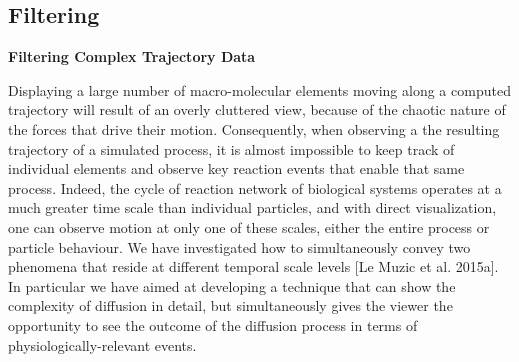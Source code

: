 \subsection{Filtering}

\textbf{Filtering Complex Trajectory Data}

Displaying a large number of macro-molecular elements moving along a computed trajectory will result of an overly cluttered view, because of the chaotic nature of the forces that drive their motion.
Consequently, when observing a the resulting trajectory of a simulated process, it is almost impossible to keep track of individual elements and observe key reaction events that enable that same process. 
Indeed, the cycle of reaction network of biological systems operates at a much greater time scale than individual particles, and with direct visualization, one can observe motion at only one of these scales, either the entire process or particle behaviour.
We have investigated how to simultaneously convey two phenomena that reside at different temporal scale levels [Le Muzic et al. 2015a]. 
In particular we have aimed at developing a technique that can show the complexity of diffusion in detail, but simultaneously gives the viewer the opportunity to see the outcome of the diffusion process in terms of physiologically-relevant events.

